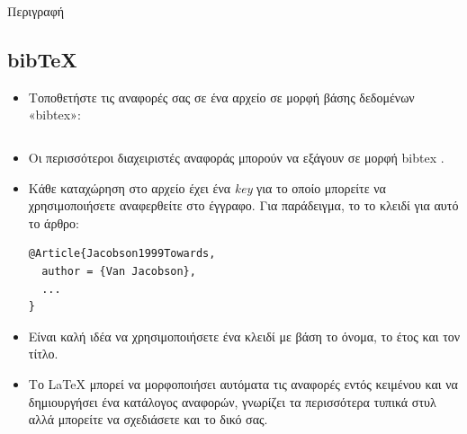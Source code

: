 \documentclass{beamer}
\begin{document}
\begin{frame}{Περιγραφή}
\begin{multicols}{2}
\tableofcontents[currentsection]
\end{multicols}
\end{frame}

\en
\subsection { bib\TeX} \gr
\begin{frame}[fragile]{\en \insertsubsection{} }
\begin{itemize}
\item Τοποθετήστε τις αναφορές σας σε ένα αρχείο \en {}\gr σε μορφή βάσης δεδομένων \en «bibtex»:
\inputminted[fontsize=\scriptsize,frame=single]{latex}{bib-example.bib}\gr
\item Οι περισσότεροι διαχειριστές αναφοράς μπορούν να εξάγουν σε μορφή \en bibtex \gr.
\end{itemize}
\end{frame}

\begin{frame}[fragile]{\en\insertsubsection{}}
\begin{itemize}
\item Κάθε καταχώρηση στο αρχείο \en{} \gr έχει ένα \en \emph{key} \gr για το οποίο μπορείτε να χρησιμοποιήσετε
αναφερθείτε στο έγγραφο. Για παράδειγμα, το \en {}\gr {} το κλειδί για αυτό το άρθρο:
\en
\begin{verbatim}
@Article{Jacobson1999Towards,
  author = {Van Jacobson},
  ...
}
\end{verbatim}
\gr
\item Είναι καλή ιδέα να χρησιμοποιήσετε ένα κλειδί με βάση το όνομα, το έτος και τον τίτλο.
\item Το \LaTeX{} μπορεί να μορφοποιήσει αυτόματα τις αναφορές εντός κειμένου και να δημιουργήσει ένα
κατάλογος αναφορών, γνωρίζει τα περισσότερα τυπικά στυλ αλλά μπορείτε να σχεδιάσετε και το δικό σας.
\end{itemize}
\end{frame}
\end{document}

